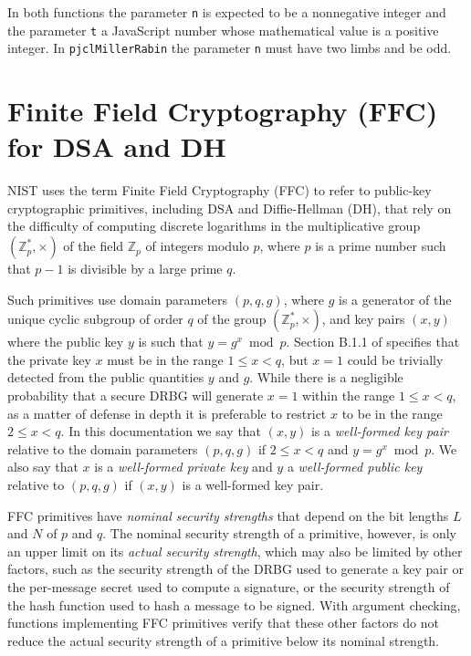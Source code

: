\documentclass[12pt]{article}
\begin{document}
In both functions the parameter {\tt n} is expected to be a nonnegative integer and the parameter {\tt t} a JavaScript number whose mathematical value is a positive integer.  In {\tt pjclMillerRabin}
the parameter {\tt n} must have two limbs and be odd.

\section{Finite Field Cryptography (FFC) for DSA and DH}
\label{s:FFC}

NIST uses the term Finite Field Cryptography (FFC) to refer to public-key cryptographic
primitives, including DSA and Diffie-Hellman (DH), that rely on the difficulty of computing discrete logarithms
in the multiplicative group $(\mathbb{Z}^*_p,\times)$ of the field $\mathbb{Z}_p$ of integers modulo $p$,
where $p$ is a prime number such that $p-1$ is divisible by a large prime $q$.  

Such primitives
use domain parameters $(p,q,g)$, where $g$ is a generator of the unique
cyclic subgroup of order $q$ of the group $(\mathbb{Z}^*_p,\times)$, and key pairs $(x,y)$ where the public key $y$ 
is such that $y = g^x \bmod p$.
Section B.1.1 of \cite{DSS-4} specifies that the private key $x$ must be in the range
$1 \leq x < q$, but $x=1$ could be trivially detected from the public
quantities $y$ and $g$.  While there is a negligible probability that a
secure DRBG will generate $x=1$ within the range $1 \leq x < q$, as 
a matter of defense in depth it is preferable to restrict $x$ to be in the 
range $2 \leq x < q$.  In this documentation we say that $(x,y)$ is a
{\em well-formed key pair\/} relative to the domain parameters $(p,q,g)$
if $2 \leq x < q$ and $y = g^x \bmod p$.  We also say that $x$ is a {\em well-formed
private key\/} and $y$ a {\em well-formed public key\/} relative to $(p,q,g)$ if $(x,y)$ is 
a well-formed key pair.

FFC primitives have {\em nominal security strengths\/} that depend on the bit lengths $L$
and $N$ of $p$ and $q$. The nominal security strength of a primitive, however, is only
an upper limit on its {\em actual security strength}, which may also be limited by other factors,
such as the security strength of the DRBG used to generate a key pair or the per-message secret
used to compute a signature, or the security strength of the hash function used to hash 
a message to be signed.  With argument checking, functions implementing FFC primitives
verify that these other factors do not reduce the actual security
strength of a primitive below its nominal strength.
\end{document}
